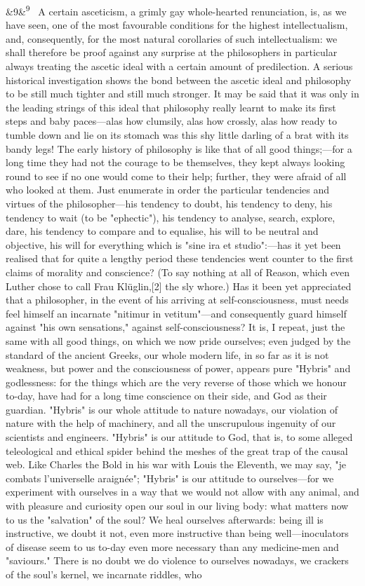 \documentclass[12pt]{article}
\newcommand{\para}[1][]{\par\noindent\ifx&#1&\else\textsuperscript{\footnotesize #1}~\fi}
\begin{document}
\para[9] A certain asceticism, a grimly gay whole-hearted renunciation, is, as we have seen, one of the most favourable conditions for the highest intellectualism, and, consequently, for the most natural corollaries of such intellectualism: we shall therefore be proof against any surprise at the philosophers in particular always treating the ascetic ideal with a certain amount of predilection. A serious historical investigation shows the bond between the ascetic ideal and philosophy to be still much tighter and still much stronger. It may be said that it was only in the leading strings of this ideal that philosophy really learnt to make its first steps and baby paces---alas how clumsily, alas how crossly, alas how ready to tumble down and lie on its stomach was this shy little darling of a brat with its bandy legs! The early history of philosophy is like that of all good things;---for a long time they had not the courage to be themselves, they kept always looking round to see if no one would come to their help; further, they were afraid of all who looked at them. Just enumerate in order the particular tendencies and virtues of the philosopher---his tendency to doubt, his tendency to deny, his tendency to wait (to be "ephectic"), his tendency to analyse, search, explore, dare, his tendency to compare and to equalise, his will to be neutral and objective, his will for everything which is "sine ira et studio":---has it yet been realised that for quite a lengthy period these tendencies went counter to the first claims of morality and conscience? (To say nothing at all of Reason, which even Luther chose to call Frau Klüglin,[2] the sly whore.) Has it been yet appreciated that a philosopher, in the event of his arriving at self-consciousness, must needs feel himself an incarnate "nitimur in vetitum"---and consequently guard himself against "his own sensations," against self-consciousness? It is, I repeat, just the same with all good things, on which we now pride ourselves; even judged by the standard of the ancient Greeks, our whole modern life, in so far as it is not weakness, but power and the consciousness of power, appears pure "Hybris" and godlessness: for the things which are the very reverse of those which we honour to-day, have had for a long time conscience on their side, and God as their guardian. "Hybris" is our whole attitude to nature nowadays, our violation of nature with the help of machinery, and all the unscrupulous ingenuity of our scientists and engineers. "Hybris" is our attitude to God, that is, to some alleged teleological and ethical spider behind the meshes of the great trap of the causal web. Like Charles the Bold in his war with Louis the Eleventh, we may say, "je combats l'universelle araignée"; "Hybris" is our attitude to ourselves---for we experiment with ourselves in a way that we would not allow with any animal, and with pleasure and curiosity open our soul in our living body: what matters now to us the "salvation" of the soul? We heal ourselves afterwards: being ill is instructive, we doubt it not, even more instructive than being well---inoculators of disease seem to us to-day even more necessary than any medicine-men and "saviours." There is no doubt we do violence to ourselves nowadays, we crackers of the soul's kernel, we incarnate riddles, who 
\end{document}
